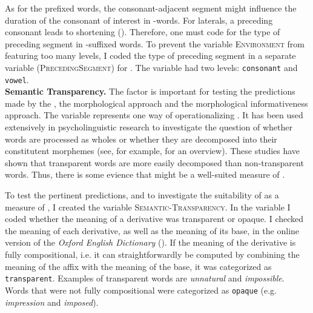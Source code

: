 As for the prefixed words, the consonant-adjacent segment might influence the duration of the consonant of interest in -words. For laterals, a preceding consonant leads to shortening (\citealt[851]{Umeda.1977}). Therefore, one must code for the type of preceding segment in -suffixed words. 
To prevent the variable \textsc{Environment} from featuring too many levels, I coded the type of preceding segment in a separate variable (\textsc{PrecedingSegment}) for . The variable had two levels: \texttt{consonant} and \texttt{vowel}. \\


\textbf{Semantic Transparency.} The factor  is important for testing the predictions made by the , the morphological  approach and the morphological informativeness approach. 
The variable represents one way of operationalizing . It has been used extensively in psycholinguistic research to investigate the question of whether words are processed as wholes or whether they are decomposed into their constitutent morphemes (see, for example, \citet{MarslenWilson.2009} for an overview). These studies have shown that transparent words are more easily decomposed than non-transparent words. Thus, there is some evience that  might be a well-suited measure of . 

To test the pertinent predictions, and to investigate the suitability of  as a measure of , I created the variable \textsc{Semantic-Transparency}. In the variable I coded whether the meaning of a derivative was transparent or opaque.
I checked the meaning of each derivative, as well as the meaning of its base, in the online version of the \textit{Oxford English Dictionary} (\citealt{OED.2013}).  If the meaning of the derivative is fully compositional, i.e. it can straightforwardly be computed by combining the meaning of the affix with the meaning of the base, it was categorized as \texttt{transparent}. 
Examples of transparent words are \textit{unnatural} and \textit{impossible}. Words that were not fully compositional were categorized as \texttt{opaque} (e.g. \textit{impression} and \textit{imposed}). \\

